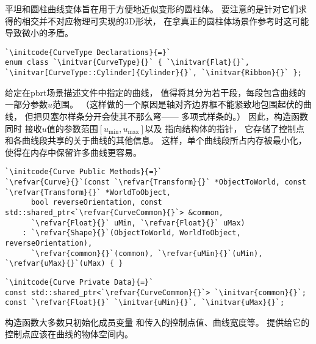 平坦和圆柱曲线变体旨在用于方便地近似变形的圆柱体。
要注意的是针对它们求得的相交并不对应物理可实现的3D形状，
在拿真正的圆柱体场景作参考时这可能导致微小的矛盾。
\begin{lstlisting}
`\initcode{CurveType Declarations}{=}`
enum class `\initvar{CurveType}{}` { `\initvar{Flat}{}`, `\initvar[CurveType::Cylinder]{Cylinder}{}`, `\initvar{Ribbon}{}` };
\end{lstlisting}

给定在pbrt场景描述文件中指定的曲线，
值得将其分为若干段，每段包含曲线的一部分参数$u$范围。
（这样做的一个原因是轴对齐边界框不能紧致地包围起伏的曲线，
但把贝塞尔样条分开会使其不那么弯——
多项式样条的。）
因此，构造函数同时
接收$u$值的参数范围$[u_{\min},u_{\max}]$以及
指向结构体的指针，
它存储了控制点和各曲线段共享的关于曲线的其他信息。
这样，单个曲线段所占内存被最小化，
使得在内存中保留许多曲线更容易。
\begin{lstlisting}
`\initcode{Curve Public Methods}{=}`
`\refvar{Curve}{}`(const `\refvar{Transform}{}` *ObjectToWorld, const `\refvar{Transform}{}` *WorldToObject,
      bool reverseOrientation, const std::shared_ptr<`\refvar{CurveCommon}{}`> &common,
      `\refvar{Float}{}` uMin, `\refvar{Float}{}` uMax)
    : `\refvar{Shape}{}`(ObjectToWorld, WorldToObject, reverseOrientation),
      `\refvar{common}{}`(common), `\refvar{uMin}{}`(uMin), `\refvar{uMax}{}`(uMax) { }
\end{lstlisting}
\begin{lstlisting}
`\initcode{Curve Private Data}{=}`
const std::shared_ptr<`\refvar{CurveCommon}{}`> `\initvar{common}{}`;
const `\refvar{Float}{}` `\initvar{uMin}{}`, `\initvar{uMax}{}`; 
\end{lstlisting}

构造函数大多数只初始化成员变量
和传入的控制点值、曲线宽度等。
提供给它的控制点应该在曲线的物体空间内。

